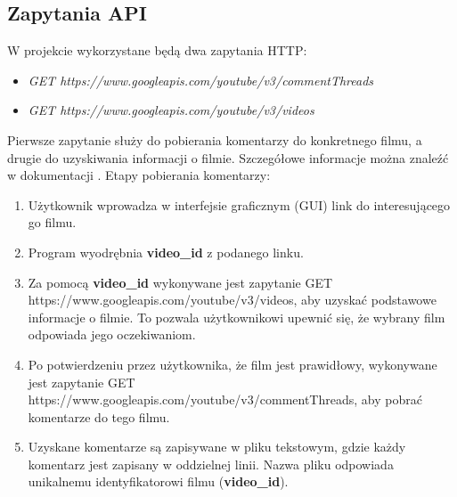 	\subsection{Zapytania API}
		W projekcie wykorzystane będą dwa zapytania HTTP:
		\begin{itemize}
			\item \textit{GET https://www.googleapis.com/youtube/v3/commentThreads}
			\item \textit{GET https://www.googleapis.com/youtube/v3/videos}
		\end{itemize}
	 	Pierwsze zapytanie służy do pobierania komentarzy do konkretnego filmu, a drugie do uzyskiwania informacji o filmie. Szczegółowe informacje można znaleźć w dokumentacji \cite{YouTubeAPI}. Etapy pobierania komentarzy:
	 	\begin{enumerate}
	 		\item Użytkownik wprowadza w interfejsie graficznym (GUI) link do interesującego go filmu.
	 		\item Program wyodrębnia \textbf{video\_id} z podanego linku.
	 		\item Za pomocą \textbf{video\_id} wykonywane jest zapytanie GET https://www.googleapis.com/youtube/v3/videos, aby uzyskać podstawowe informacje o filmie. To pozwala użytkownikowi upewnić się, że wybrany film odpowiada jego oczekiwaniom.
	 		\item Po potwierdzeniu przez użytkownika, że film jest prawidłowy, wykonywane jest zapytanie GET https://www.googleapis.com/youtube/v3/commentThreads, aby pobrać komentarze do tego filmu.
	 		\item Uzyskane komentarze są zapisywane w pliku tekstowym, gdzie każdy komentarz jest zapisany w oddzielnej linii. Nazwa pliku odpowiada unikalnemu identyfikatorowi filmu (\textbf{video\_id}).
	 	\end{enumerate}
	
